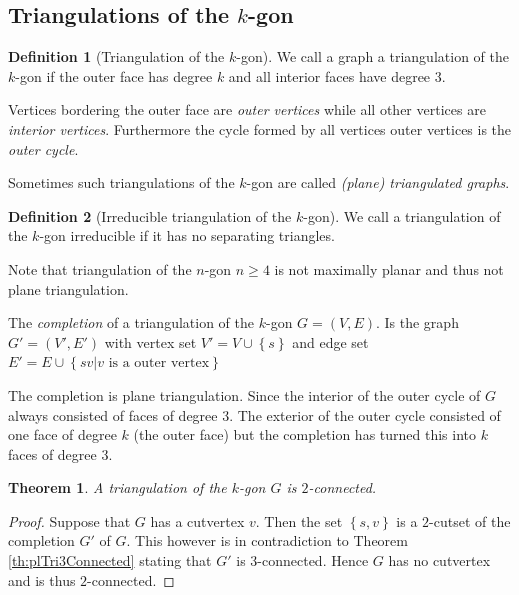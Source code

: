\documentclass[a4paper]{article}
\newtheorem{thrm}{Theorem}
\theoremstyle{definition}
\newtheorem*{defi}{Definition}
\newcommand{\braces}[1]{\left\lbrace {#1} \right\rbrace}
\begin{document}
\subsection{Triangulations of the $k$-gon}

\begin{defi}[Triangulation of the $k$-gon]
We call a graph a triangulation of the $k$-gon if the outer face has degree $k$ and all interior faces have degree $3$.
\end{defi}
Vertices bordering the outer face are \emph{outer vertices} while all other vertices are \emph{interior vertices}. Furthermore the cycle formed by all vertices outer vertices is the \emph{outer cycle}.

Sometimes such triangulations of the $k$-gon are called \emph{(plane) triangulated graphs}.


\begin{defi}[Irreducible triangulation of the $k$-gon]
We call a triangulation of the $k$-gon irreducible if it has no separating triangles.
\end{defi}


Note that triangulation of the $n$-gon $n\geq 4$ is not maximally planar and thus not plane triangulation.

The \emph{completion} of a triangulation of the $k$-gon $G = (V, E)$. Is the graph $G'= (V', E')$ with vertex set $V' = V \cup \braces{s}$ and edge set $E' = E \cup \braces{ sv | v \text{ is a outer vertex}}$ 

The completion is plane triangulation.  %
Since the interior of the outer cycle of $G$ always consisted of faces of degree 3. The exterior of the outer cycle consisted of one face of degree $k$ (the outer face) but the completion has turned this into $k$ faces of degree $3$.  

\begin{thrm}
A triangulation of the $k$-gon $G$ is $2$-connected.
\end{thrm}
\begin{proof}
Suppose that $G$ has a cutvertex $v$. Then the set $\braces{s, v}$ is a $2$-cutset of the completion $G'$ of $G$. This however is in contradiction to Theorem \ref{th:plTri3Connected} stating that $G'$ is $3$-connected. Hence $G$ has no cutvertex and is thus $2$-connected.
\end{proof}
\end{document}
